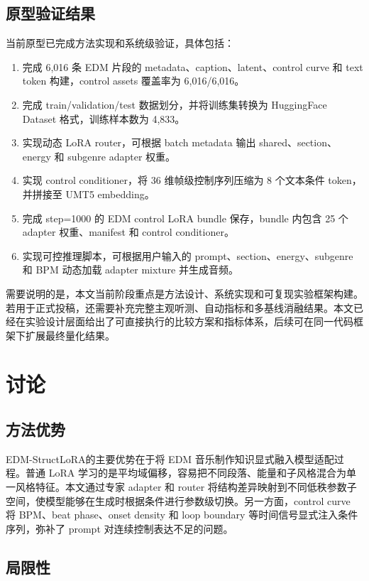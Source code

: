 \documentclass[UTF8,a4paper,zihao=-4,fontset=none]{ctexart}
\newcommand{\modelname}{EDM-StructLoRA}
\begin{document}
\subsection{原型验证结果}

当前原型已完成方法实现和系统级验证，具体包括：

\begin{enumerate}[leftmargin=2em,itemsep=0.2em]
  \item 完成 6,016 条 EDM 片段的 metadata、caption、latent、control curve 和 text token 构建，control assets 覆盖率为 6,016/6,016。
  \item 完成 train/validation/test 数据划分，并将训练集转换为 HuggingFace Dataset 格式，训练样本数为 4,833。
  \item 实现动态 LoRA router，可根据 batch metadata 输出 shared、section、energy 和 subgenre adapter 权重。
  \item 实现 control conditioner，将 36 维帧级控制序列压缩为 8 个文本条件 token，并拼接至 UMT5 embedding。
  \item 完成 step=1000 的 EDM control LoRA bundle 保存，bundle 内包含 25 个 adapter 权重、manifest 和 control conditioner。
  \item 实现可控推理脚本，可根据用户输入的 prompt、section、energy、subgenre 和 BPM 动态加载 adapter mixture 并生成音频。
\end{enumerate}

需要说明的是，本文当前阶段重点是方法设计、系统实现和可复现实验框架构建。若用于正式投稿，还需要补充完整主观听测、自动指标和多基线消融结果。本文已经在实验设计层面给出了可直接执行的比较方案和指标体系，后续可在同一代码框架下扩展最终量化结果。

\section{讨论}

\subsection{方法优势}

\modelname 的主要优势在于将 EDM 音乐制作知识显式融入模型适配过程。普通 LoRA 学习的是平均域偏移，容易把不同段落、能量和子风格混合为单一风格特征。本文通过专家 adapter 和 router 将结构差异映射到不同低秩参数子空间，使模型能够在生成时根据条件进行参数级切换。另一方面，control curve 将 BPM、beat phase、onset density 和 loop boundary 等时间信号显式注入条件序列，弥补了 prompt 对连续控制表达不足的问题。

\subsection{局限性}
\end{document}
